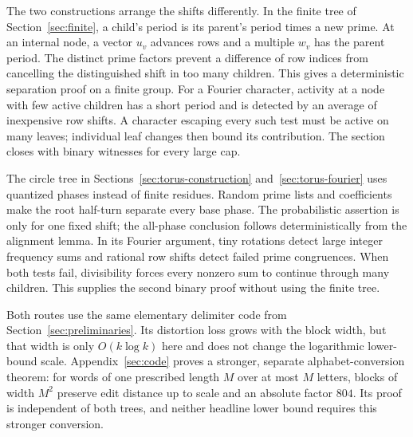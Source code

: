 The two constructions arrange the shifts differently.
In the finite tree of Section~\ref{sec:finite}, a child's period is its
parent's period times a new prime. At an internal node, a vector $u_v$
advances rows and a multiple $w_v$ has the parent period. The distinct
prime factors prevent a difference of row indices from cancelling the
distinguished shift in too many children. This gives a deterministic
separation proof on a finite group. For a Fourier character, activity at
a node with few active children has a short period and is detected by
an average of inexpensive row shifts. A character escaping every such
test must be active on many leaves; individual leaf changes then bound
its contribution. The section closes with binary witnesses for every
large cap.

The circle tree in Sections~\ref{sec:torus-construction}
and~\ref{sec:torus-fourier} uses quantized phases instead of finite
residues. Random prime lists and coefficients make the root half-turn
separate every base phase. The probabilistic assertion is only for one
fixed shift; the all-phase conclusion follows deterministically from
the alignment lemma. In its Fourier argument, tiny rotations detect
large integer frequency sums and rational row shifts detect failed
prime congruences. When both tests fail, divisibility forces every
nonzero sum to continue through many children. This supplies the second
binary proof without using the finite tree.

Both routes use the same elementary delimiter code from
Section~\ref{sec:preliminaries}. Its distortion loss grows with the
block width, but that width is only $O(k\log k)$ here and does not
change the logarithmic lower-bound scale. Appendix~\ref{sec:code}
proves a stronger, separate alphabet-conversion theorem: for words of
one prescribed length $M$ over at most $M$ letters, blocks of width
$M^2$ preserve edit distance up to scale and an absolute factor $804$.
Its proof is independent of both trees, and neither headline lower
bound requires this stronger conversion.
